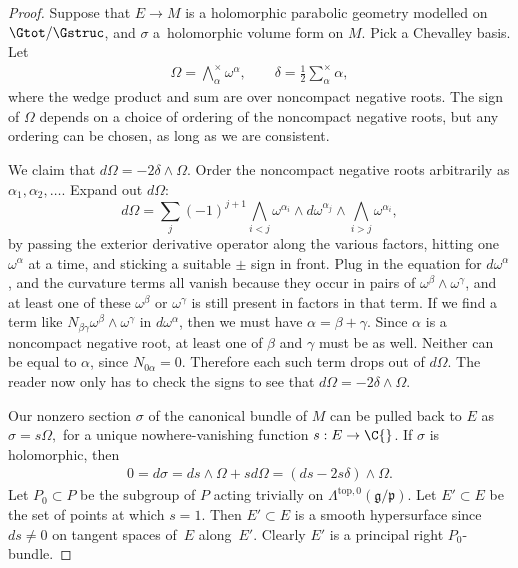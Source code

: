 \begin{proof}
Suppose that $E \to M$ is a holomorphic parabolic
geometry modelled on $\Gtot/\Gstruc$,
and $\sigma$ a~holomorphic volume form on $M$.
Pick a Chevalley basis. Let
\begin{gather*}
\Omega  = \bigwedge^{\times}_{\alpha} \omega^{\alpha}, \qquad
\delta  = \frac{1}{2} \sum^{\times}_{\alpha} \alpha,
\end{gather*}
where the wedge product and sum are over noncompact negative roots.
The sign of $\Omega$ depends on a choice of ordering
of the noncompact negative roots, but any ordering can be chosen, as
long as we are consistent.

We claim that $d \Omega = - 2 \delta \wedge \Omega$.
Order the noncompact negative
roots arbitrarily as $\alpha_1, \alpha_2, \dots$.
Expand out $d \Omega$:
\[
d \Omega
=
 \sum_{j}
(-1)^{j+1}
\bigwedge_{i < j} \omega^{\alpha_i}
\wedge d \omega^{\alpha_j}
\wedge
\bigwedge_{i > j} \omega^{\alpha_i},
\]
by passing the exterior derivative operator along
the various factors, hitting one $\omega^{\alpha}$
at a time, and sticking a suitable $\pm$ sign in front.
Plug in the equation for $d \omega^{\alpha}$,
and the curvature terms all vanish because they
occur in pairs of $\omega^{\beta} \wedge \omega^{\gamma}$,
and at least one of these $\omega^{\beta}$ or $\omega^{\gamma}$
is still present in factors in that term.
If we f\/ind a term like $N_{\beta \gamma} \omega^{\beta}
\wedge \omega^{\gamma}$ in $d \omega^{\alpha}$,
then we must have $\alpha=\beta+\gamma$.
Since $\alpha$ is a noncompact negative root, at least one
of $\beta$ and $\gamma$ must be as well. Neither can be
equal to $\alpha$, since $N_{0\alpha}=0$. Therefore
each such term drops out of $d \Omega$. The reader
now only has to check the signs to see that
$d \Omega = -2 \delta \wedge \Omega$.

Our nonzero section $\sigma$ of the canonical
bundle of $M$ can be pulled back to $E$ as
\(
\sigma = s \Omega,
\)
for a unique nowhere-vanishing function $s : E \to \C{}$.
If $\sigma$ is holomorphic, then
\begin{gather*}
0  =
d\sigma
 =
ds \wedge \Omega + s   d \Omega
=
\left(ds - 2 s \delta \right) \wedge \Omega.
\end{gather*}
Let $P_0 \subset P$ be the subgroup of $P$
acting trivially on
$\Lambda^{\text{top},0}\left(\mathfrak{g}/\mathfrak{p}\right)$.
Let $E' \subset E$ be the set of points at which
$s=1$. Then $E' \subset E$ is a smooth hypersurface since $ds \ne 0$
on tangent spaces of~$E$ along~$E'.$ Clearly
$E'$ is a principal right $P_0$-bundle.


\end{proof}
